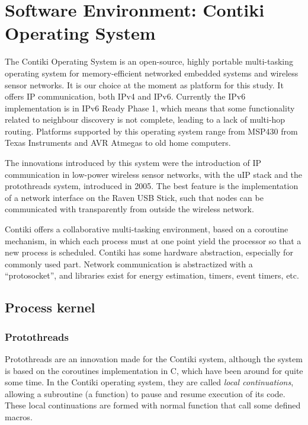 \normalfont\normalsize
\chapter{Software Environment: Contiki Operating System}

The Contiki Operating System is an open-source, highly portable multi-tasking operating system for memory-efficient
networked embedded systems and wireless sensor networks. It is our choice at the moment as platform for this study. 
It offers IP communication, both IPv4 and IPv6. Currently the IPv6 implementation is in IPv6 Ready Phase 1, which 
means that some functionality related to neighbour discovery is not complete, leading to a lack of multi-hop routing.
Platforms supported by this operating system range from MSP430 from Texas Instruments and AVR Atmegas to old home computers.

The innovations introduced by this system were the introduction of IP communication in low-power wireless sensor networks,
with the uIP stack and the protothreads system, introduced in 2005. The best feature is the implementation of a network 
interface on the Raven USB Stick, such that nodes can be communicated with transparently from outside the wireless network.  

Contiki offers a collaborative multi-tasking environment, based on a coroutine mechanism, in which each process must at one
point yield the processor so that a new process is scheduled. Contiki has some hardware abstraction, especially for commonly used
part. Network communication is abstractized with a ``protosocket'', and libraries exist for energy estimation, timers, event timers, etc.

\clearpage

\section{Process kernel}
\subsection{Protothreads}

Protothreads are an innovation made for the Contiki system, although the system is based on the coroutines implementation in C,
which have been around for quite some time. In the Contiki operating system, they are called \textit{local continuations}, allowing
a subroutine (a function) to pause and resume execution of its code. These local continuations are formed with normal function that
call some defined macros.

